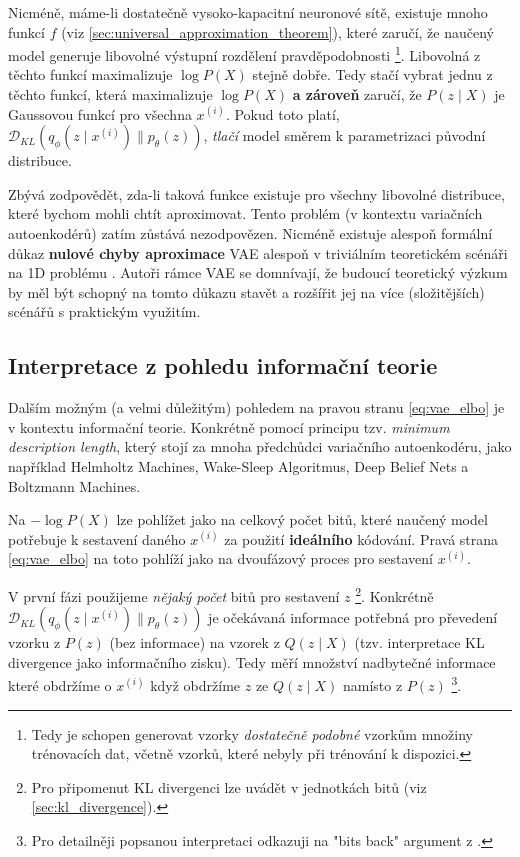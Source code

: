 Nicméně, máme-li dostatečně vysoko-kapacitní neuronové sítě, existuje mnoho funkcí $f$ (viz \autoref{sec:universal_approximation_theorem}), které zaručí, že naučený model generuje libovolné výstupní rozdělení pravděpodobnosti
\footnote{Tedy je schopen generovat vzorky \emph{dostatečně podobné} vzorkům množiny trénovacích dat, včetně vzorků, které nebyly při trénování k dispozici.}.
Libovolná z těchto funkcí maximalizuje $\log P(X)$ stejně dobře. Tedy stačí vybrat jednu z těchto funkcí, která maximalizuje $\log P(X)$ \textbf{a zároveň} zaručí, že $P (z\mid X)$ je Gaussovou funkcí pro všechna $x^{(i)}$.
Pokud toto platí, $\mathcal{D}_{KL}(q_\phi(z\mid x^{(i)})\parallel p_\theta(z))$, \emph{tlačí} model směrem k parametrizaci původní distribuce.

Zbývá zodpovědět, zda-li taková funkce existuje pro všechny libovolné distribuce, které bychom mohli chtít aproximovat.
Tento problém (v kontextu variačních autoenkodérů) zatím zůstává nezodpovězen. Nicméně existuje alespoň formální důkaz \textbf{nulové chyby aproximace} VAE alespoň v triviálním teoretickém scénáři na 1D problému \cite[Příloha A]{Doersch2021}.
Autoři rámce VAE se domnívají, že budoucí teoretický výzkum by měl být schopný na tomto důkazu stavět a rozšířit jej na více (složitějších) scénářů s praktickým využitím. 

\subsection{Interpretace z pohledu informační teorie}
\label{sec:vae_information_theory_interpretation}
Dalším možným (a velmi důležitým) pohledem na pravou stranu \autoref{eq:vae_elbo} je v kontextu informační teorie.
Konkrétně pomocí principu tzv. \emph{minimum description length}, který stojí za mnoha předchůdci variačního autoenkodéru, jako například Helmholtz Machines, Wake-Sleep Algoritmus, Deep Belief Nets a Boltzmann Machines.

Na $- \log P(X)$ lze pohlížet jako na celkový počet bitů, které naučený model potřebuje k sestavení daného $x^{(i)}$ za použití \textbf{ideálního} kódování.
Pravá strana \autoref{eq:vae_elbo} na toto pohlíží jako na dvoufázový proces pro sestavení $x^{(i)}$.

V první fázi použijeme \emph{nějaký počet} bitů pro sestavení $z$ \footnote{Pro připomenut KL divergenci lze uvádět v jednotkách bitů (viz \autoref{sec:kl_divergence}).}.
Konkrétně $\mathcal{D}_{KL}(q_\phi(z\mid x^{(i)})\parallel p_\theta(z))$ je očekávaná informace potřebná pro převedení vzorku z $P(z)$ (bez informace) na vzorek z $Q(z\mid X)$ (tzv. interpretace KL divergence jako informačního zisku).
Tedy měří množství nadbytečné informace které obdržíme o $x^{(i)}$ když obdržíme $z$ ze $Q(z\mid X)$ namísto z $P(z)$
\footnote{Pro detailněji popsanou interpretaci odkazuji na "bits back" argument z \cite[Sekce 5.2]{Hinton1993}.}.

